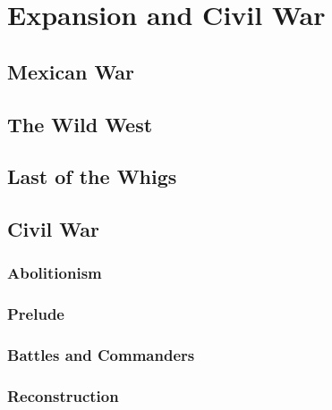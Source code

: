 \chapter{Expansion and Civil War}

\section{Mexican War}

\section{The Wild West}

\section{Last of the Whigs}

\section{Civil War}

\subsection*{Abolitionism}

\subsection*{Prelude}

\subsection*{Battles and Commanders}

\subsection*{Reconstruction}

